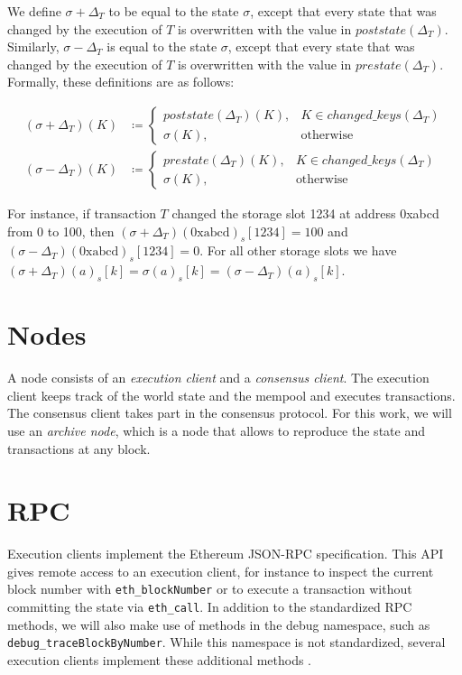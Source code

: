 \documentclass[draft,final]{vutinfth} %
\begin{document}
We define $\sigma + \Delta_T$ to be equal to the state $\sigma$, except that every state that was changed by the execution of $T$ is overwritten with the value in $poststate(\Delta_T)$. Similarly, $\sigma - \Delta_T$ is equal to the state $\sigma$, except that every state that was changed by the execution of $T$ is overwritten with the value in $prestate(\Delta_T)$. Formally, these definitions are as follows:

\begin{align*}
    (\sigma + \Delta_T)(K) & \coloneqq
    \begin{cases}
        poststate(\Delta_T)(K), & K \in changed\_keys(\Delta_T) \\
        \sigma(K),              & \text{otherwise}
    \end{cases} \\
    (\sigma - \Delta_T)(K) & \coloneqq
    \begin{cases}
        prestate(\Delta_T)(K), & K \in changed\_keys(\Delta_T) \\
        \sigma(K),             & \text{otherwise}
    \end{cases}
\end{align*}

For instance, if transaction $T$ changed the storage slot 1234 at address 0xabcd from 0 to 100, then $(\sigma + \Delta_T)(\text{0xabcd})_s[1234] = 100$ and $(\sigma - \Delta_T)(\text{0xabcd})_s[1234] = 0$. For all other storage slots we have $(\sigma + \Delta_T)(a)_s[k] = \sigma(a)_s[k] = (\sigma - \Delta_T)(a)_s[k]$.

\section{Nodes}

A node consists of an \emph{execution client} and a \emph{consensus client}. The execution client keeps track of the world state and the mempool and executes transactions. The consensus client takes part in the consensus protocol. For this work, we will use an \emph{archive node}, which is a node that allows to reproduce the state and transactions at any block. \cite{noauthor_nodes_2024}

\section{RPC}

Execution clients implement the Ethereum JSON-RPC specification. \cite{noauthor_ethereum_2024} This API gives remote access to an execution client, for instance to inspect the current block number with \verb|eth_blockNumber| or to execute a transaction without committing the state via \verb|eth_call|. In addition to the standardized RPC methods, we will also make use of methods in the debug namespace, such as \verb|debug_traceBlockByNumber|. While this namespace is not standardized, several execution clients implement these additional methods \cite{noauthor_go-ethereum_2024}\cite{noauthor_rpc_2024}\cite{noauthor_reth_2024}.
\end{document}
